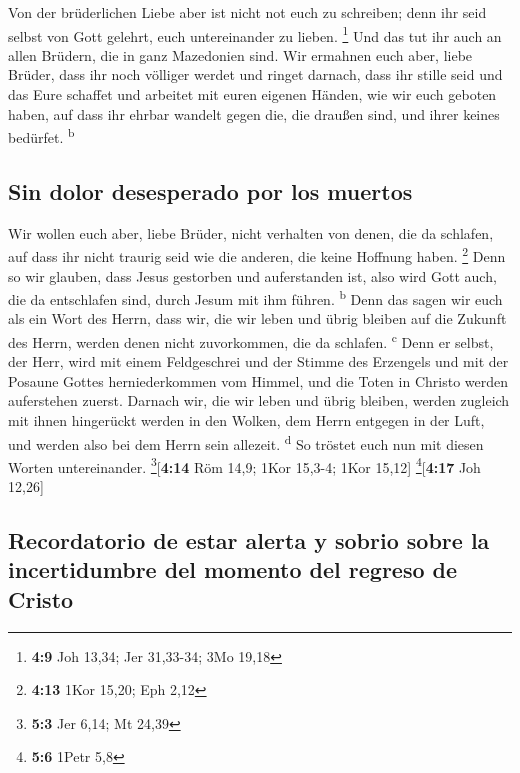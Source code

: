  Von der brüderlichen Liebe aber ist nicht not euch zu
schreiben; denn ihr seid selbst von Gott gelehrt, euch untereinander zu
lieben. \footnote{\textbf{4:9} Joh 13,34; Jer 31,33-34; 3Mo 19,18}
 Und das tut ihr auch an allen Brüdern, die in ganz
Mazedonien sind. Wir ermahnen euch aber, liebe Brüder, dass ihr noch
völliger werdet  und ringet darnach, dass ihr stille seid
und das Eure schaffet und arbeitet mit euren eigenen Händen, wie wir
euch geboten haben,  auf dass ihr ehrbar wandelt gegen
die, die draußen sind, und ihrer keines bedürfet. \textsuperscript{b}

\hypertarget{sin-dolor-desesperado-por-los-muertos}{%
\subsection{Sin dolor desesperado por los
muertos}\label{sin-dolor-desesperado-por-los-muertos}}

 Wir wollen euch aber, liebe Brüder, nicht verhalten von
denen, die da schlafen, auf dass ihr nicht traurig seid wie die anderen,
die keine Hoffnung haben. \footnote{\textbf{4:13} 1Kor 15,20; Eph 2,12}
 Denn so wir glauben, dass Jesus gestorben und
auferstanden ist, also wird Gott auch, die da entschlafen sind, durch
Jesum mit ihm führen. \textsuperscript{b}  Denn das sagen
wir euch als ein Wort des Herrn, dass wir, die wir leben und übrig
bleiben auf die Zukunft des Herrn, werden denen nicht zuvorkommen, die
da schlafen. \textsuperscript{c}  Denn er selbst, der
Herr, wird mit einem Feldgeschrei und der Stimme des Erzengels und mit
der Posaune Gottes herniederkommen vom Himmel, und die Toten in Christo
werden auferstehen zuerst.  Darnach wir, die wir leben
und übrig bleiben, werden zugleich mit ihnen hingerückt werden in den
Wolken, dem Herrn entgegen in der Luft, und werden also bei dem Herrn
sein allezeit. \textsuperscript{d}  So tröstet euch nun
mit diesen Worten untereinander. \footnote{\textbf{5:3} Jer 6,14; Mt
  24,39}{[}\textbf{4:14} Röm 14,9; 1Kor 15,3-4; 1Kor 15,12{]}
\footnote{\textbf{5:6} 1Petr 5,8}{[}\textbf{4:17} Joh 12,26{]}

\hypertarget{recordatorio-de-estar-alerta-y-sobrio-sobre-la-incertidumbre-del-momento-del-regreso-de-cristo}{%
\subsection{Recordatorio de estar alerta y sobrio sobre la incertidumbre
del momento del regreso de
Cristo}\label{recordatorio-de-estar-alerta-y-sobrio-sobre-la-incertidumbre-del-momento-del-regreso-de-cristo}}

